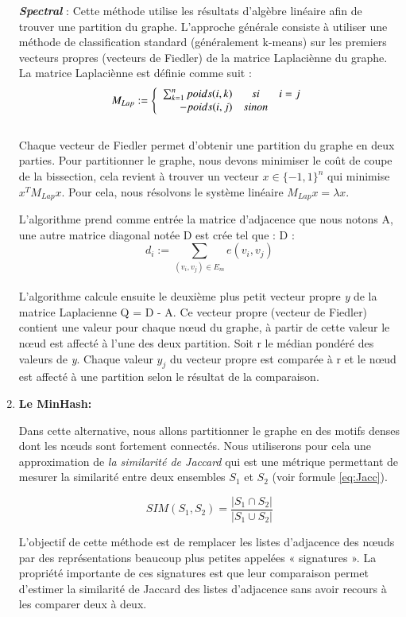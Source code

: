 \documentclass[a4paper,oneside,12pt]{report}
\theoremstyle{definition}
\begin{document}
\begin{enumerate}
\textbf{\textit{Spectral}} : Cette méthode utilise les résultats d'algèbre linéaire afin de trouver une partition du graphe. L'approche générale consiste à utiliser une méthode de classification standard (généralement k-means) sur  les premiers vecteurs propres (vecteurs de Fiedler) de la matrice Laplaciènne du graphe. La matrice Laplaciènne est définie comme suit : 
\[{M}_{Lap} :=
			\left\{
			\begin{array}{r c l}
			\sum_{k=1}^n poids(i,k)   & si & i=j \\
			-poids(i,j) & sinon
			\end{array}
			\right.
			\]
			\\
Chaque vecteur de Fiedler permet d’obtenir une partition du graphe en
deux parties. Pour partitionner le graphe, nous devons minimiser le coût de coupe de la bissection, cela revient à trouver un vecteur $x \in \{-1,1\}^n $ qui minimise $x^T M_{Lap}x$. Pour cela, nous résolvons le système linéaire $M_{Lap}x = \lambda x$.

L'algorithme prend comme entrée la matrice d'adjacence que nous notons A, une autre matrice diagonal notée D est crée tel que :    
D : \[{d}_{i} := \sum_{(v_i,v_j) \in E_m} e(v_i,v_j)
			\]
			\\
L'algorithme calcule ensuite le deuxième plus petit vecteur propre \textit{y} de la matrice Laplacienne Q = D - A. Ce vecteur propre (vecteur de Fiedler) contient une valeur pour chaque nœud du graphe, à partir de cette valeur le nœud est affecté à l'une des deux partition. Soit r le médian pondéré des valeurs de \textit{y}. Chaque valeur $y_j$ du vecteur propre est comparée à r et le nœud est affecté à une partition selon le résultat de la comparaison.\\
	



\item \textbf{Le MinHash:}

Dans cette alternative, nous allons partitionner le graphe en des motifs denses dont les nœuds sont fortement connectés. Nous utiliserons pour cela une approximation de \textit{la similarité de Jaccard} qui est une métrique permettant de mesurer la similarité entre deux ensembles $S_1$ et $S_2$ (voir formule \ref{eq:Jacc}). 

\begin{equation} \label{eq:Jacc}
SIM(S_1,S_2)=\frac{|S_1 \cap S_2|}{|S_1 \cup S_2|}
\end{equation}


L'objectif de cette méthode est de remplacer les listes d'adjacence des nœuds par des représentations beaucoup plus petites appelées « signatures ». La propriété importante de ces signatures est que leur comparaison permet d'estimer la similarité de Jaccard des listes d'adjacence sans avoir recours à les comparer deux à deux. 


\end{enumerate}
\end{document}
